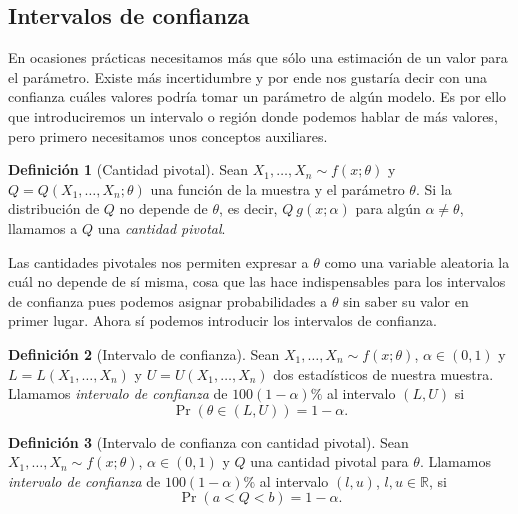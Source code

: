 \documentclass[11pt,letterpaper]{article}
\theoremstyle{definition}
\newtheorem{definition}{Definición}[section]
\theoremstyle{theorem}
\theoremstyle{remark}
\begin{document}
	\subsection{Intervalos de confianza}
	\noindent En ocasiones prácticas necesitamos más que sólo una estimación de un valor para el parámetro. Existe más incertidumbre y por ende nos gustaría decir con una confianza cuáles valores podría tomar un parámetro de algún modelo. Es por ello que introduciremos un intervalo o región donde podemos hablar de más valores, pero primero necesitamos unos conceptos auxiliares.
	\begin{definition}[Cantidad pivotal]
		Sean \(X_1,\dots,X_n\sim f(x;\theta)\) y \(Q=Q(X_1,\dots,X_n;\theta)\) una función de la muestra y el parámetro \(\theta\). Si la distribución de \(Q\) no depende de \(\theta\), es decir, \(Q~g(x;\alpha)\) para algún \(\alpha\neq\theta\), llamamos a \(Q\) una \textit{cantidad pivotal}.
	\end{definition}
	Las cantidades pivotales nos permiten expresar a \(\theta\) como una variable aleatoria la cuál no depende de sí misma, cosa que las hace indispensables para los intervalos de confianza pues podemos asignar probabilidades a \(\theta\) sin saber su valor en primer lugar. Ahora sí podemos introducir los intervalos de confianza.
	\begin{definition}[Intervalo de confianza]
		Sean \(X_1,\dots,X_n\sim f(x;\theta)\), \(\alpha\in(0,1)\) y \(L=L(X_1,\dots,X_n)\) y \(U=U(X_1,\dots,X_n)\) dos estadísticos de nuestra muestra. Llamamos \textit{intervalo de confianza} de \(100(1-\alpha)\%\) al intervalo \((L,U)\) si \[\Pr(\theta\in(L,U))=1-\alpha.\]
	\end{definition}
	\begin{definition}[Intervalo de confianza con cantidad pivotal]
		Sean \(X_1,\dots,X_n\sim f(x;\theta)\), \(\alpha\in(0,1)\) y \(Q\) una cantidad pivotal para \(\theta\). Llamamos \textit{intervalo de confianza} de \(100(1-\alpha)\%\) al intervalo \((l,u)\), \(l,u\in\mathbb{R}\), si \[\Pr(a<Q<b)=1-\alpha.\]
	\end{definition}
\end{document}
